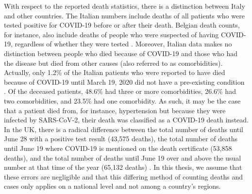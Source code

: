 \documentclass[12pt]{article}
\begin{document}
	With respect to the reported death statistics, there is a distinction between Italy and other countries. The Italian numbers include deaths of all patients who were tested positive for COVID-19 before or after their death. Belgian death counts, for instance, also include deaths of people who were suspected of having COVID-19, regardless of whether they were tested \parencite{schultz2020belgiumDeathRate}. Moreover, Italian data makes no distinction between people who died because of COVID-19 and those who had the disease but died from other causes (also referred to as comorbidities). Actually, only 1.2\% of the Italian patients who were reported to have died because of COVID-19 until March 19, 2020 did not have a pre-existing condition \parencite{ecdc2020riskassessment}. Of the deceased patients, 48.6\% had three or more comorbidities, 26.6\% had two comorbidities, and 23.5\% had one comorbidity. %
	As such, it may be the case that a patient died from, for instance, hypertension but because they were infected by SARS-CoV-2, their death was classified as a COVID-19 death instead. %
	In the UK, there is a radical difference between the total number of deaths until June 28 with a positive test result (43,575 deaths), the total number of deaths until June 19 where COVID-19 is mentioned on the death certificate (53,858 deaths), and the total number of deaths until June 19 over and above the usual number at that time of the year (65,132 deaths) \parencite{bbc2020deathrate}. %
	In this thesis, we assume that these errors are negligible and that this differing method of counting deaths and cases only applies on a national level and not among a country's regions.
	\\
	
\end{document}
